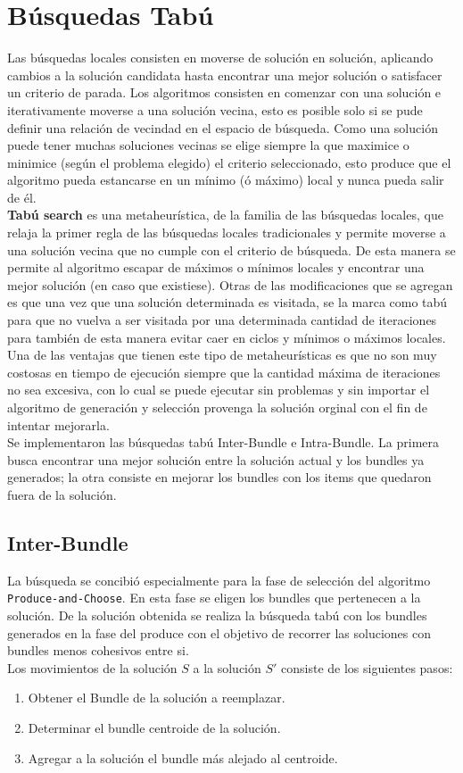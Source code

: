\section{Búsquedas Tabú}
Las búsquedas locales consisten en moverse de solución en solución, aplicando cambios a la solución candidata hasta encontrar una mejor solución o satisfacer un criterio de parada. Los algoritmos consisten en comenzar con una solución e iterativamente moverse a una solución vecina, esto es posible solo si se pude definir una relación de vecindad en el espacio de búsqueda. Como una solución puede tener muchas soluciones vecinas se elige siempre la que maximice o minimice (según el problema elegido) el criterio seleccionado, esto produce que el algoritmo pueda estancarse en un mínimo (ó máximo) local y nunca pueda salir de él.\\
\textbf{Tabú search} es una metaheurística, de la familia de las búsquedas locales, que relaja la primer regla de las búsquedas locales tradicionales y permite moverse a una solución vecina que no cumple con el criterio de búsqueda. De esta manera se permite al algoritmo escapar de máximos o mínimos locales y encontrar una mejor solución (en caso que existiese). Otras de las modificaciones que se agregan es que una vez que una solución determinada es visitada, se la marca como tabú para que no vuelva a ser visitada por una determinada cantidad de iteraciones para también de esta manera evitar caer en ciclos y mínimos o máximos locales.\\
Una de las ventajas que tienen este tipo de metaheurísticas es que no son muy costosas en tiempo de ejecución siempre que la cantidad máxima de iteraciones no sea excesiva, con lo cual se puede ejecutar sin problemas y sin importar el algoritmo de generación y selección provenga la solución orginal con el fin de intentar mejorarla.\\
Se implementaron las búsquedas tabú Inter-Bundle e Intra-Bundle. La primera busca encontrar una mejor solución entre la solución actual y los bundles ya generados; la otra consiste en mejorar los bundles con los items que quedaron fuera de la solución.

\subsection{Inter-Bundle}
La búsqueda se concibió especialmente para la fase de selección del algoritmo \texttt{Produce-and-Choose}. En esta fase se eligen los bundles que pertenecen a la solución. De la solución obtenida se realiza la búsqueda tabú con los bundles generados en la fase del produce con el objetivo de recorrer las soluciones con bundles menos cohesivos entre si.\\
Los movimientos de la solución $S$ a la solución $S'$ consiste de los siguientes  pasos:
\begin{enumerate}
	\item Obtener el Bundle de la solución a reemplazar.
	\item Determinar el bundle centroide de la solución.
	\item Agregar a la solución el bundle más alejado al centroide.
\end{enumerate}

